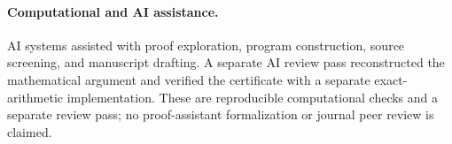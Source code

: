 \documentclass[11pt]{article}
\begin{document}
\paragraph{Computational and AI assistance.}
AI systems assisted with proof exploration, program construction, source
screening, and manuscript drafting. A separate AI review pass reconstructed
the mathematical argument and verified the certificate with a separate
exact-arithmetic implementation. These are reproducible computational
checks and a separate review pass; no proof-assistant formalization or
journal peer review is claimed.



\end{document}
